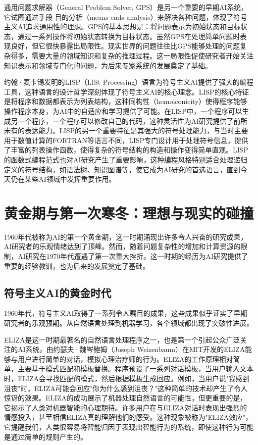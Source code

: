 通用问题求解器（General Problem Solver, GPS）是另一个重要的早期AI系统，它试图通过手段-目的分析（means-ends analysis）来解决各种问题，体现了符号主义AI追求通用性的理想。GPS的基本思想是：将问题表示为初始状态和目标状态，通过一系列操作将初始状态转换为目标状态。虽然GPS在处理简单问题时表现良好，但它很快暴露出局限性。现实世界的问题往往比GPS能够处理的问题复杂得多，需要大量的领域知识和复杂的推理过程。这一局限性促使研究者开始关注知识表示和领域专门化的问题，为后来专家系统的发展奠定了基础。

约翰·麦卡锡发明的LISP（LISt Processing）语言为符号主义AI提供了强大的编程工具，这种语言的设计哲学深刻体现了符号主义AI的核心理念。LISP的核心特征是将程序和数据都表示为列表结构，这种同构性（homoiconicity）使得程序能够操作程序本身，为AI中的自适应和学习提供了可能。在LISP中，一个程序可以生成另一个程序，一个程序可以修改自己的代码，这种灵活性为AI研究提供了前所未有的表达能力。LISP的另一个重要特征是其强大的符号处理能力，与当时主要用于数值计算的FORTRAN等语言不同，LISP专门设计用于处理符号信息，提供了丰富的列表操作函数，使得复杂的符号结构的构造和操作变得简单直观。LISP的函数式编程范式也对AI研究产生了重要影响，这种编程风格特别适合处理递归定义的符号结构，如语法树、知识图谱等，使它成为AI研究的首选语言，直到今天仍在某些AI领域中发挥重要作用。

\section{黄金期与第一次寒冬：理想与现实的碰撞}

1960年代被称为AI的第一个黄金期，这一时期涌现出许多令人兴奋的研究成果，AI研究者的乐观情绪达到了顶峰。然而，随着问题复杂性的增加和计算资源的限制，AI研究在1970年代遭遇了第一次重大挫折。这一时期的经历为AI研究提供了重要的经验教训，也为后来的发展奠定了基础。

\subsection{符号主义AI的黄金时代}

1960年代，符号主义AI取得了一系列令人瞩目的成果，这些成果似乎证实了早期研究者的乐观预期。从自然语言处理到机器学习，各个领域都出现了突破性进展。

ELIZA是这一时期最著名的自然语言处理程序之一，也是第一个引起公众广泛关注的AI系统。由约瑟夫·魏岑鲍姆（Joseph Weizenbaum）在MIT开发的ELIZA能够与用户进行简单的对话，模拟心理治疗师的行为。ELIZA的工作原理相对简单，主要基于模式匹配和模板替换。程序预设了一系列对话模板，当用户输入文本时，ELIZA会寻找匹配的模式，然后根据模板生成回应。例如，当用户说"我感到沮丧"时，ELIZA可能会回应"你为什么感到沮丧？"这种简单的技术却产生了令人惊讶的效果。ELIZA的成功展示了机器处理自然语言的可能性，但更重要的是，它揭示了人类对机器智能的心理期待。许多用户在与ELIZA对话时表现出强烈的情感投入，甚至相信ELIZA真的理解他们的感受。这种现象被称为"ELIZA效应"，它提醒我们，人类很容易将智能归因于表现出智能行为的系统，即使这种行为可能是通过简单的规则产生的。


